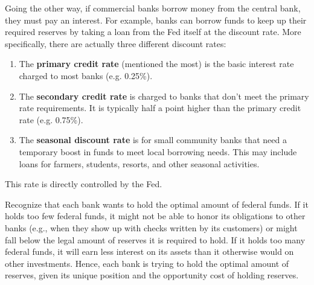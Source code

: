 \documentclass{article}
\begin{document}
    \begin{definition}
      \label{def:discount-rate}
      Going the other way, if commercial banks borrow money from the central bank, they must pay an interest. For example, banks can borrow funds to keep up their required reserves by taking a loan from the Fed itself at the discount rate. More specifically, there are actually three different discount rates: 
      \begin{enumerate}
        \item The \textbf{primary credit rate} (mentioned the most) is the basic interest rate charged to most banks (e.g. 0.25\%). 
        \item The \textbf{secondary credit rate} is charged to banks that don't meet the primary rate requirements. It is typically half a point higher than the primary credit rate (e.g. 0.75\%). 
        \item The \textbf{seasonal discount rate} is for small community banks that need a temporary boost in funds to meet local borrowing needs. This may include loans for farmers, students, resorts, and other seasonal activities. 
      \end{enumerate}
      This rate is directly controlled by the Fed. 
    \end{definition}

    Recognize that each bank wants to hold the optimal amount of federal funds. If it holds too few federal funds, it might not be able to honor its obligations to other banks (e.g., when they show up with checks written by its customers) or might fall below the legal amount of reserves it is required to hold. If it holds too many federal funds, it will earn less interest on its assets than it otherwise would on other investments. Hence, each bank is trying to hold the optimal amount of reserves, given its unique position and the opportunity cost of holding reserves. 
\end{document}
